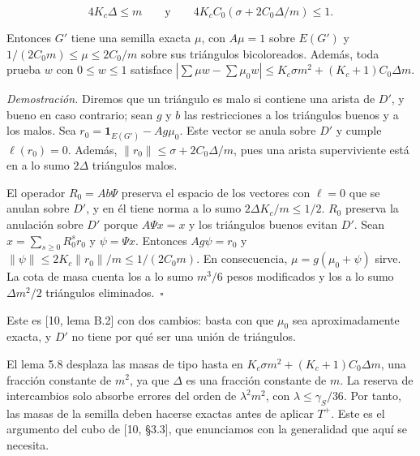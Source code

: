 \documentclass[spanish,11pt,a4paper]{article}
\begin{document}
\nopagebreak[4]
\[4K_c\Delta\le m\qquad\text{y}\qquad4K_cC_0(\sigma+2C_0\Delta/m)\le1.\]

Entonces \(G'\) tiene una semilla exacta \(\mu\), con \(A\mu=1\) sobre \(E(G')\) y \(1/(2C_0m)\le\mu\le2C_0/m\) sobre sus triángulos bicoloreados. Además, toda prueba \(w\) con \(0\le w\le1\) satisface \(|\sum\mu w-\sum\mu_0w|\le K_c\sigma m^2+(K_c+1)C_0\Delta m\).

\emph{Demostración.} Diremos que un triángulo es malo si contiene una arista de \(D'\), y bueno en caso contrario; sean \(g\) y \(b\) las restricciones a los triángulos buenos y a los malos. Sea \(r_0=\mathbf 1_{E(G')}-Ag\mu_0\). Este vector se anula sobre \(D'\) y cumple \(\ell(r_0)=0\). Además, \(\|r_0\|\le\sigma+2C_0\Delta/m\), pues una arista superviviente está en a lo sumo \(2\Delta\) triángulos malos.

El operador \(R_0=Ab\Psi\) preserva el espacio de los vectores con \(\ell=0\) que se anulan sobre \(D'\), y en él tiene norma a lo sumo \(2\Delta K_c/m\le1/2\). \(R_0\) preserva la anulación sobre \(D'\) porque \(A\Psi x=x\) y los triángulos buenos evitan \(D'\). Sean \(x=\sum_{s\ge0}R_0^sr_0\) y \(\psi=\Psi x\). Entonces \(Ag\psi=r_0\) y \(\|\psi\|\le2K_c\|r_0\|/m\le1/(2C_0m)\). En consecuencia, \(\mu=g(\mu_0+\psi)\) sirve. La cota de masa cuenta los a lo sumo \(m^3/6\) pesos modificados y los a lo sumo \(\Delta m^2/2\) triángulos eliminados.~\(\square\)

Este es {[}10, lema B.2{]} con dos cambios: basta con que \(\mu_0\) sea aproximadamente exacta, y \(D'\) no tiene por qué ser una unión de triángulos.

El lema 5.8 desplaza las masas de tipo hasta en \(K_c\sigma m^2+(K_c+1)C_0\Delta m\), una fracción constante de \(m^2\), ya que \(\Delta\) es una fracción constante de \(m\). La reserva de intercambios solo absorbe errores del orden de \(\lambda^2m^2\), con \(\lambda\le\gamma_S/36\). Por tanto, las masas de la semilla deben hacerse exactas antes de aplicar \(T^+\). Este es el argumento del cubo de {[}10, §3.3{]}, que enunciamos con la generalidad que aquí se necesita.
\end{document}
